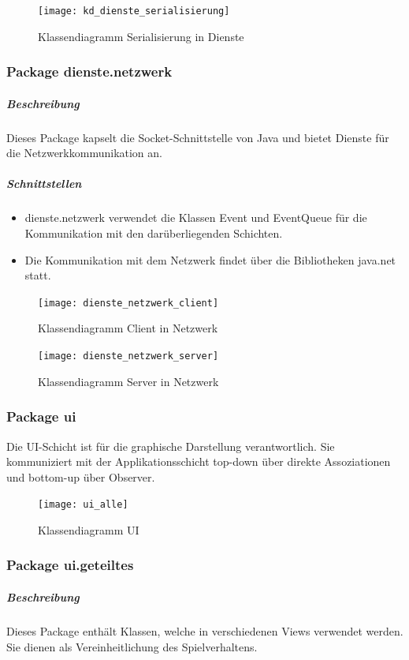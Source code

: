 \documentclass[12pt,halfparskip]{scrartcl}
\begin{document}
\begin{figure}[h]
	\centering
	\texttt{[image: kd\_dienste\_serialisierung]}
	\caption{Klassendiagramm Serialisierung in Dienste}
	\label{fig:kd_dienste_serialisierung}
\end{figure}

\clearpage
\subsubsection{Package dienste.netzwerk}
\label{ssub:package_dienste_netzwerk}
\subparagraph{Beschreibung}
Dieses Package kapselt die Socket-Schnittstelle von Java und bietet Dienste für die Netzwerkkommunikation an.

\subparagraph{Schnittstellen}
\begin{itemize}
	\item dienste.netzwerk verwendet die Klassen Event und EventQueue für die Kommunikation mit den darüberliegenden Schichten.
	\item Die Kommunikation mit dem Netzwerk findet über die Bibliotheken java.net statt.
\end{itemize}

\begin{figure}[h]
	\centering
	\texttt{[image: dienste\_netzwerk\_client]}
	\caption{Klassendiagramm Client in Netzwerk}
	\label{fig:dienste_netzwerk_client}
\end{figure}

\begin{figure}[h]
	\centering
	\texttt{[image: dienste\_netzwerk\_server]}
	\caption{Klassendiagramm Server in Netzwerk}
	\label{fig:dienste_netzwerk_server}
\end{figure}

\clearpage
\subsubsection{Package ui}
\label{ssub:package_ui}
Die UI-Schicht ist für die graphische Darstellung verantwortlich. Sie kommuniziert mit der Applikationsschicht top-down über direkte Assoziationen und bottom-up über Observer.

\begin{figure}[h]
	\centering
	\texttt{[image: ui\_alle]}
	\caption{Klassendiagramm UI}
	\label{fig:ui_alle}
\end{figure}

\clearpage
\subsubsection{Package ui.geteiltes}
\label{ssub:package_ui_geteiltes}
\subparagraph{Beschreibung}
Dieses Package enthält Klassen, welche in verschiedenen Views verwendet werden. Sie dienen als Vereinheitlichung des Spielverhaltens.
\end{document}
